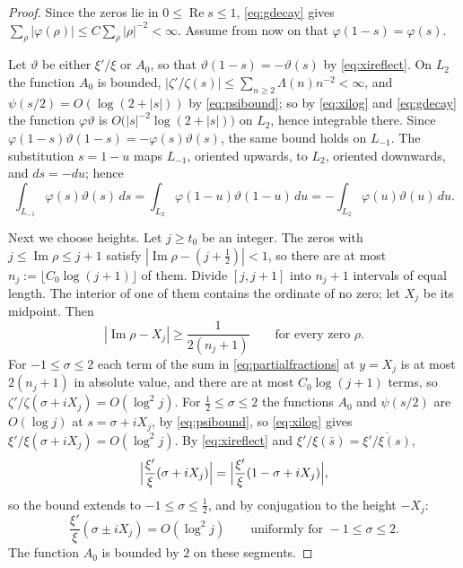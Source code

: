 \documentclass[11pt]{amsart}
\theoremstyle{remark}
\numberwithin{equation}{section}
\newcommand{\Rel}{\operatorname{Re}}
\newcommand{\Iml}{\operatorname{Im}}
\begin{document}
\begin{proof}
Since the zeros lie in $0\le\Rel s\le1$, \eqref{eq:gdecay} gives
$\sum_\rho|\varphi(\rho)|\le C\sum_\rho|\rho|^{-2}<\infty$.  Assume from now on
that $\varphi(1-s)=\varphi(s)$.

Let $\vartheta$ be either $\xi'/\xi$ or $A_0$, so that $\vartheta(1-s)=-\vartheta(s)$ by
\eqref{eq:xireflect}.  On $L_2$ the function $A_0$ is bounded,
$|\zeta'/\zeta(s)|\le\sum_{n\ge2}\Lambda(n)n^{-2}<\infty$, and
$\psi(s/2)=O(\log(2+|s|))$ by \eqref{eq:psibound}; so by \eqref{eq:xilog} and
\eqref{eq:gdecay} the function $\varphi \vartheta$ is $O\bigl(|s|^{-2}\log(2+|s|)\bigr)$ on
$L_2$, hence integrable there.  Since $\varphi(1-s)\vartheta(1-s)=-\varphi(s)\vartheta(s)$, the same
bound holds on $L_{-1}$.  The substitution $s=1-u$ maps $L_{-1}$, oriented
upwards, to $L_2$, oriented downwards, and $ds=-du$; hence
\begin{equation}
\label{eq:reflect}
  \int_{L_{-1}}\varphi(s)\vartheta(s)\,ds=\int_{L_2}\varphi(1-u)\vartheta(1-u)\,du
  =-\int_{L_2}\varphi(u)\vartheta(u)\,du .
\end{equation}

Next we choose heights.  Let $j\ge t_0$ be an integer.  The zeros with
$j\le\Iml\rho\le j+1$ satisfy $|\Iml\rho-(j+\tfrac12)|<1$, so there are at
most $n_j:=\lfloor C_0\log(j+1)\rfloor$ of them.  Divide $[j,j+1]$ into
$n_j+1$ intervals of equal length.  The interior of one of them contains the
ordinate of no zero; let $X_j$ be its midpoint.  Then
\begin{equation}
\label{eq:heights}
  |\Iml\rho-X_j|\ge\frac1{2(n_j+1)}\qquad\text{for every zero }\rho .
\end{equation}
For $-1\le\sigma\le2$ each term of the sum in \eqref{eq:partialfractions} at
$y=X_j$ is at most $2(n_j+1)$ in absolute value, and there are at most
$C_0\log(j+1)$ terms, so $\zeta'/\zeta(\sigma+iX_j)=O(\log^2j)$.  For
$\tfrac12\le\sigma\le2$ the functions $A_0$ and $\psi(s/2)$ are $O(\log j)$
at $s=\sigma+iX_j$, by \eqref{eq:psibound}, so \eqref{eq:xilog} gives
$\xi'/\xi(\sigma+iX_j)=O(\log^2j)$.  By \eqref{eq:xireflect} and
$\xi'/\xi(\bar s)=\overline{\xi'/\xi(s)}$,
\[
  \Bigl|\frac{\xi'}{\xi}(\sigma+iX_j)\Bigr|
  =\Bigl|\frac{\xi'}{\xi}(1-\sigma+iX_j)\Bigr| ,
\]
so the bound extends to $-1\le\sigma\le\tfrac12$, and by conjugation to the
height $-X_j$:
\begin{equation}
\label{eq:horizontal}
  \frac{\xi'}{\xi}(\sigma\pm iX_j)=O(\log^2j)
  \qquad\text{uniformly for }-1\le\sigma\le2 .
\end{equation}
The function $A_0$ is bounded by $2$ on these segments.


\end{proof}
\end{document}
